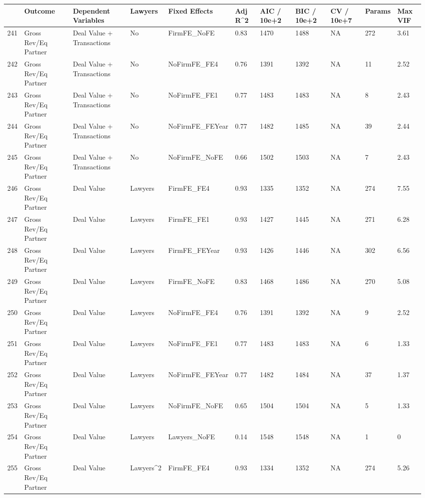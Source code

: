 \documentclass{article}
\begin{document}
\begin{table}[H]
\centering
\begin{tabular}{rllllllllll}
  \hline
 & Outcome & Dependent Variables & Lawyers & Fixed Effects & Adj R^2 & AIC / 10e+2 & BIC / 10e+2 & CV / 10e+7 & Params & Max VIF \\
  \hline
241 & Gross Rev/Eq Partner & Deal Value + Transactions & No & FirmFE\_NoFE & 0.83 & 1470 & 1488 & NA & 272 & 3.61 \\
  242 & Gross Rev/Eq Partner & Deal Value + Transactions & No & NoFirmFE\_FE4 & 0.76 & 1391 & 1392 & NA & 11 & 2.52 \\
  243 & Gross Rev/Eq Partner & Deal Value + Transactions & No & NoFirmFE\_FE1 & 0.77 & 1483 & 1483 & NA & 8 & 2.43 \\
  244 & Gross Rev/Eq Partner & Deal Value + Transactions & No & NoFirmFE\_FEYear & 0.77 & 1482 & 1485 & NA & 39 & 2.44 \\
  245 & Gross Rev/Eq Partner & Deal Value + Transactions & No & NoFirmFE\_NoFE & 0.66 & 1502 & 1503 & NA & 7 & 2.43 \\
  246 & Gross Rev/Eq Partner & Deal Value & Lawyers & FirmFE\_FE4 & 0.93 & 1335 & 1352 & NA & 274 & 7.55 \\
  247 & Gross Rev/Eq Partner & Deal Value & Lawyers & FirmFE\_FE1 & 0.93 & 1427 & 1445 & NA & 271 & 6.28 \\
  248 & Gross Rev/Eq Partner & Deal Value & Lawyers & FirmFE\_FEYear & 0.93 & 1426 & 1446 & NA & 302 & 6.56 \\
  249 & Gross Rev/Eq Partner & Deal Value & Lawyers & FirmFE\_NoFE & 0.83 & 1468 & 1486 & NA & 270 & 5.08 \\
  250 & Gross Rev/Eq Partner & Deal Value & Lawyers & NoFirmFE\_FE4 & 0.76 & 1391 & 1392 & NA & 9 & 2.52 \\
  251 & Gross Rev/Eq Partner & Deal Value & Lawyers & NoFirmFE\_FE1 & 0.77 & 1483 & 1483 & NA & 6 & 1.33 \\
  252 & Gross Rev/Eq Partner & Deal Value & Lawyers & NoFirmFE\_FEYear & 0.77 & 1482 & 1484 & NA & 37 & 1.37 \\
  253 & Gross Rev/Eq Partner & Deal Value & Lawyers & NoFirmFE\_NoFE & 0.65 & 1504 & 1504 & NA & 5 & 1.33 \\
  254 & Gross Rev/Eq Partner & Deal Value & Lawyers & Lawyers\_NoFE & 0.14 & 1548 & 1548 & NA & 1 & 0 \\
  255 & Gross Rev/Eq Partner & Deal Value & Lawyers^2 & FirmFE\_FE4 & 0.93 & 1334 & 1352 & NA & 274 & 5.26 \\

\end{tabular}
\end{table}
\end{document}
